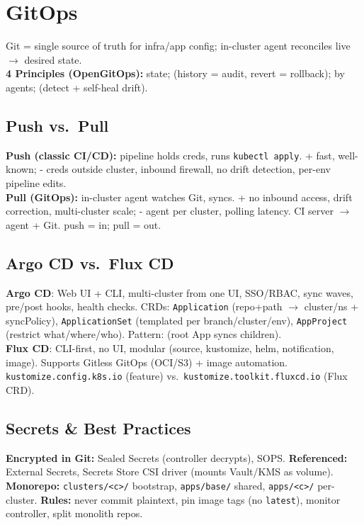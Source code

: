 \section{GitOps}
Git = single source of truth for infra/app config; in-cluster agent reconciles live $\rightarrow$ desired state. \\
\textbf{4 Principles (OpenGitOps):}  state;  (history = audit, revert = rollback);  by agents;  (detect + self-heal drift).

\subsection{Push vs.\ Pull}
\textbf{Push (classic CI/CD):} pipeline holds creds, runs \texttt{kubectl apply}. + fast, well-known; - creds outside cluster, inbound firewall, no drift detection, per-env pipeline edits. \\
\textbf{Pull (GitOps):} in-cluster agent watches Git, syncs. + no inbound access, drift correction, multi-cluster scale; - agent per cluster, polling latency.  CI server $\rightarrow$ agent + Git.  push = in; pull = out.

\subsection{Argo CD vs.\ Flux CD}
\textbf{Argo CD}: Web UI + CLI, multi-cluster from one UI, SSO/RBAC, sync waves, pre/post hooks, health checks. CRDs: \texttt{Application} (repo+path $\rightarrow$ cluster/ns + syncPolicy), \texttt{ApplicationSet} (templated per branch/cluster/env), \texttt{AppProject} (restrict what/where/who). Pattern:  (root App syncs children). \\
\textbf{Flux CD}: CLI-first, no UI, modular  (source, kustomize, helm, notification, image). Supports Gitless GitOps (OCI/S3) + image automation.  \texttt{kustomize.config.k8s.io} (feature) vs.\ \texttt{kustomize.toolkit.fluxcd.io} (Flux CRD).

\subsection{Secrets \& Best Practices}
\textbf{Encrypted in Git:} Sealed Secrets (controller decrypts), SOPS. \textbf{Referenced:} External Secrets, Secrets Store CSI driver (mounts Vault/KMS as volume). \\
\textbf{Monorepo:} \texttt{clusters/<c>/} bootstrap, \texttt{apps/base/} shared, \texttt{apps/<c>/} per-cluster. \textbf{Rules:} never commit plaintext, pin image tags (no \texttt{latest}), monitor controller, split monolith repos.

